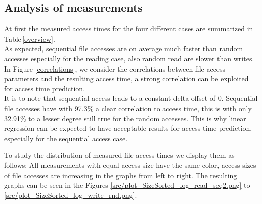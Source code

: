 \documentclass{superfri}
\begin{document}
\subsection{Analysis of measurements}
\label{sec:measurements}
At first the measured access times for the four different cases are summarized in Table\,\ref{overview}.
\\
As expected, sequential file accesses are on average much faster than random accesses especially for the reading case, also random read are slower than writes.\\
In Figure \ref{correlations}, we consider the correlations between file access parameters and the resulting access time, a strong correlation can be exploited for access time prediction.
\\
It is to note that sequential access leads to a constant delta-offset of $0$.
Sequential file accesses have with 97.3\% a clear correlation to access time, this is with only 32.91\% to a lesser degree still true for the random accesses.
This is why linear regression can be expected to have acceptable results for access time prediction, especially for the sequential access case.\medskip

To study the distribution of measured file access times we display them as follows:
All measurements with equal access size have the same color, access sizes of file accesses are increasing in the graphs from left to right.
The resulting graphs can be seen in the Figures \ref{src/plot_SizeSorted_log_read_seq2.png} to \ref{src/plot_SizeSorted_log_write_rnd.png}.
\end{document}

